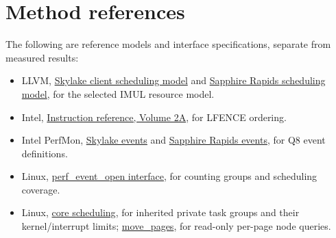 \documentclass[11pt]{article}
\begin{document}
\section{Method references}
The following are reference models and interface specifications, separate from measured results:
\begin{itemize}
\item LLVM, \href{https://raw.githubusercontent.com/llvm/llvm-project/main/llvm/lib/Target/X86/X86SchedSkylakeClient.td}{Skylake client scheduling model} and \href{https://raw.githubusercontent.com/llvm/llvm-project/main/llvm/lib/Target/X86/X86SchedSapphireRapids.td}{Sapphire Rapids scheduling model}, for the selected IMUL resource model.
\item Intel, \href{https://www.intel.com/content/dam/www/public/us/en/documents/manuals/64-ia-32-architectures-software-developer-vol-2a-manual.pdf}{Instruction reference, Volume 2A}, for LFENCE ordering.
\item Intel PerfMon, \href{https://raw.githubusercontent.com/intel/perfmon/main/SKL/events/skylake_core.json}{Skylake events} and \href{https://raw.githubusercontent.com/intel/perfmon/main/SPR/events/sapphirerapids_core.json}{Sapphire Rapids events}, for Q8 event definitions.
\item Linux, \href{https://man7.org/linux/man-pages/man2/perf_event_open.2.html}{perf\_event\_open interface}, for counting groups and scheduling coverage.
\item Linux, \href{https://docs.kernel.org/admin-guide/hw-vuln/core-scheduling.html}{core scheduling}, for inherited private task groups and their kernel/interrupt limits; \href{https://man7.org/linux/man-pages/man2/move_pages.2.html}{move\_pages}, for read-only per-page node queries.
\end{itemize}
\end{document}
